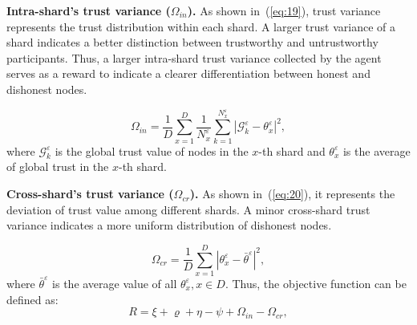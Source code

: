 \noindent\textbf{Intra-shard's trust variance ($\Omega_{in}$).}
As shown in~(\ref{eq:19}), trust variance represents the trust distribution within each shard. A larger trust variance of a shard indicates a better distinction between trustworthy and untrustworthy participants. Thus, a larger intra-shard trust variance collected by the agent serves as a reward to indicate a clearer differentiation between honest and dishonest nodes.

\begin{equation}
    \label{eq:19}
    \Omega_{in} = \frac{1}{D} \sum_{x=1}^{D} \frac{1}{N_{x}^\varepsilon} \sum_{k=1}^{N_{x}^{\varepsilon}} \left | \mathcal{G}_{k}^\varepsilon - \theta_{x}^{\varepsilon} \right |^2,
\end{equation} %
where $\mathcal{G}_{k}^\varepsilon$ is the global trust value of nodes in the $x$-th shard and $\theta_{x}^{\varepsilon}$ is the average of global trust in the $x$-th shard. 

\smallskip
\noindent\textbf{Cross-shard's trust variance ($\Omega_{cr}$).}
As shown in~(\ref{eq:20}), it represents the deviation of trust value among different shards. A minor cross-shard trust variance indicates a more uniform distribution of dishonest nodes.

\begin{equation}
    \label{eq:20}
    \Omega_{cr} = \frac{1}{D} \sum_{x=1}^D \left | \theta_{x}^{\varepsilon} -  \bar\theta^{\varepsilon}  \right |^2,
\end{equation} %
where $\bar\theta^{\varepsilon}$ is the average value of all $\theta_{x}^{\varepsilon}, x \in D$. 
Thus, the objective function can be defined as:
\begin{equation}
\label{eq:21}
    R = \xi +\varrho + \eta - \psi + \Omega_{in} -\Omega_{cr},
\end{equation}

